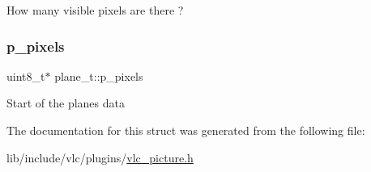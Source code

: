 How many visible pixels are there ? \mbox{\label{structplane__t_a95aba7322ec8203d7d0975d6b31b4985}} 
\subsubsection{\texorpdfstring{p\+\_\+pixels}{p\_pixels}}
{\footnotesize\ttfamily uint8\+\_\+t$\ast$ plane\+\_\+t\+::p\+\_\+pixels}

Start of the plane\textquotesingle{}s data 

The documentation for this struct was generated from the following file\+:\begin{DoxyCompactItemize}
\item 
lib/include/vlc/plugins/\hyperlink{vlc__picture_8h}{vlc\+\_\+picture.\+h}\end{DoxyCompactItemize}
